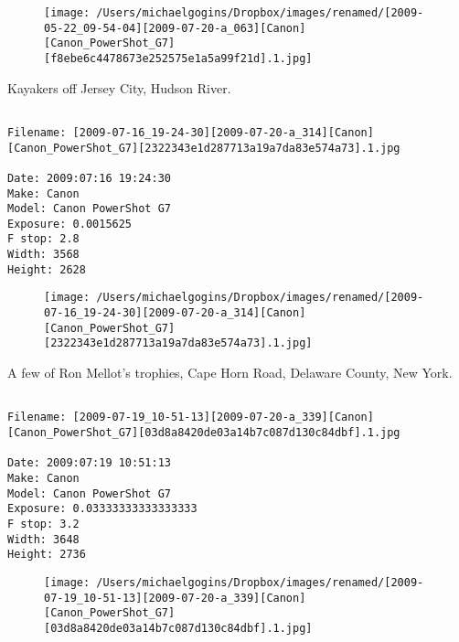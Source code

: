 \documentclass[11pt,letter,DIV=14,paper=landscape]{scrbook}
\begin{document}
\begin{figure}
\texttt{[image: /Users/michaelgogins/Dropbox/images/renamed/[2009-05-22\_09-54-04][2009-07-20-a\_063][Canon][Canon\_PowerShot\_G7][f8ebe6c4478673e252575e1a5a99f21d].1.jpg]}
\end{figure}
    
\clearpage
\noindent Kayakers off Jersey City, Hudson River.
\noindent
\begin{lstlisting}

Filename: [2009-07-16_19-24-30][2009-07-20-a_314][Canon][Canon_PowerShot_G7][2322343e1d287713a19a7da83e574a73].1.jpg

Date: 2009:07:16 19:24:30
Make: Canon
Model: Canon PowerShot G7
Exposure: 0.0015625
F stop: 2.8
Width: 3568
Height: 2628
\end{lstlisting}
\clearpage

\begin{figure}
\texttt{[image: /Users/michaelgogins/Dropbox/images/renamed/[2009-07-16\_19-24-30][2009-07-20-a\_314][Canon][Canon\_PowerShot\_G7][2322343e1d287713a19a7da83e574a73].1.jpg]}
\end{figure}
    
\clearpage
\noindent A few of Ron Mellot's trophies, Cape Horn Road, Delaware County, New York.
\noindent
\begin{lstlisting}

Filename: [2009-07-19_10-51-13][2009-07-20-a_339][Canon][Canon_PowerShot_G7][03d8a8420de03a14b7c087d130c84dbf].1.jpg

Date: 2009:07:19 10:51:13
Make: Canon
Model: Canon PowerShot G7
Exposure: 0.03333333333333333
F stop: 3.2
Width: 3648
Height: 2736
\end{lstlisting}
\clearpage

\begin{figure}
\texttt{[image: /Users/michaelgogins/Dropbox/images/renamed/[2009-07-19\_10-51-13][2009-07-20-a\_339][Canon][Canon\_PowerShot\_G7][03d8a8420de03a14b7c087d130c84dbf].1.jpg]}
\end{figure}
    
\end{document}
